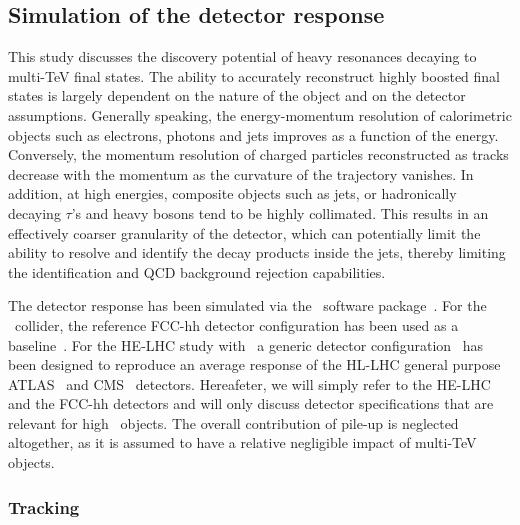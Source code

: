 \documentclass[a4paper,11pt]{article}
\begin{document}
\subsection{Simulation of the detector response}
\label{subsec:detparam}

This study discusses the discovery potential of heavy resonances decaying to multi-TeV final states. The ability to accurately reconstruct highly boosted final states is largely dependent on the nature of the object and on the detector assumptions. Generally speaking, the energy-momentum resolution of calorimetric objects such as electrons, photons and jets improves as a function of the energy. Conversely, the momentum resolution of charged particles reconstructed as tracks decrease with the momentum as the curvature of the trajectory vanishes. In addition, at high energies, composite objects such as jets, or hadronically decaying $\tau$'s and heavy bosons tend to be highly collimated. This results in an effectively coarser granularity of the detector, which can potentially limit the ability to resolve and identify the decay products inside the jets, thereby limiting the identification and QCD background rejection capabilities. 

The detector response has been simulated via the \delphes{}~software package~\cite{deFavereau:2013fsa}. For the \sqrtsfcc\ collider, the reference FCC-hh detector configuration has been used as a baseline~\cite{cdr_volume3, delphes_card_fcc}. For the HE-LHC study with \sqrtshelhc\, a generic detector configuration~\cite{delphes_card_helhc} has been designed to reproduce an average response of the HL-LHC general purpose ATLAS~\cite{Aad:2008zzm,Capeans:2010jnh} and CMS~\cite{Chatrchyan:2008aa} detectors. Hereafeter, we will simply refer to the HE-LHC and the FCC-hh detectors and will only discuss detector specifications that are relevant for high \pt\ objects. The overall contribution of pile-up is neglected altogether, as it is assumed to have a relative negligible impact of multi-TeV objects.

\subsubsection{Tracking}
\label{appsub:tracking}
\end{document}
